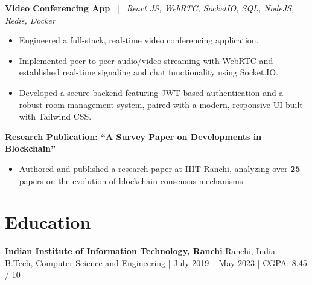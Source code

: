 \documentclass[8pt,a4paper]{extarticle}
\newcommand{\role}[2]{%
  \noindent\textbf{#1} \hfill #2\\[1pt]
}
\begin{document}
\textbf{Video Conferencing App} \ | \ \textit{React JS, WebRTC, SocketIO, SQL, NodeJS, Redis, Docker}
\begin{itemize}
\item  Engineered a full-stack, real-time video conferencing application.
\item  Implemented peer-to-peer audio/video streaming with WebRTC and established real-time signaling and chat functionality using Socket.IO.
\item  Developed a secure backend featuring JWT-based authentication and a robust room management system, paired with a modern, responsive UI built with Tailwind CSS.
\end{itemize}

\textbf{Research Publication: ``A Survey Paper on Developments in Blockchain''}
\begin{itemize}
  \item Authored and published a research paper at IIIT Ranchi, analyzing over \textbf{25} papers on the evolution of blockchain consensus mechanisms.
\end{itemize}

\section*{Education}
\role{Indian Institute of Information Technology, Ranchi}{Ranchi, India}
B.Tech, Computer Science and Engineering | July 2019 -- May 2023 | CGPA: 8.45 / 10
\end{document}
